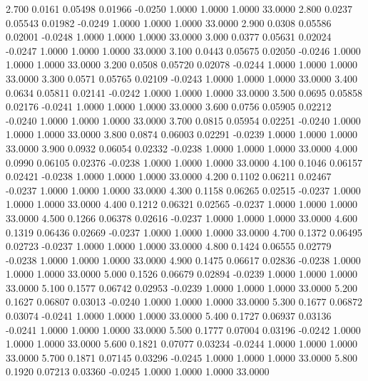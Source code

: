    2.700   0.0161   0.05498   0.01966  -0.0250   1.0000   1.0000   1.0000  33.0000
   2.800   0.0237   0.05543   0.01982  -0.0249   1.0000   1.0000   1.0000  33.0000
   2.900   0.0308   0.05586   0.02001  -0.0248   1.0000   1.0000   1.0000  33.0000
   3.000   0.0377   0.05631   0.02024  -0.0247   1.0000   1.0000   1.0000  33.0000
   3.100   0.0443   0.05675   0.02050  -0.0246   1.0000   1.0000   1.0000  33.0000
   3.200   0.0508   0.05720   0.02078  -0.0244   1.0000   1.0000   1.0000  33.0000
   3.300   0.0571   0.05765   0.02109  -0.0243   1.0000   1.0000   1.0000  33.0000
   3.400   0.0634   0.05811   0.02141  -0.0242   1.0000   1.0000   1.0000  33.0000
   3.500   0.0695   0.05858   0.02176  -0.0241   1.0000   1.0000   1.0000  33.0000
   3.600   0.0756   0.05905   0.02212  -0.0240   1.0000   1.0000   1.0000  33.0000
   3.700   0.0815   0.05954   0.02251  -0.0240   1.0000   1.0000   1.0000  33.0000
   3.800   0.0874   0.06003   0.02291  -0.0239   1.0000   1.0000   1.0000  33.0000
   3.900   0.0932   0.06054   0.02332  -0.0238   1.0000   1.0000   1.0000  33.0000
   4.000   0.0990   0.06105   0.02376  -0.0238   1.0000   1.0000   1.0000  33.0000
   4.100   0.1046   0.06157   0.02421  -0.0238   1.0000   1.0000   1.0000  33.0000
   4.200   0.1102   0.06211   0.02467  -0.0237   1.0000   1.0000   1.0000  33.0000
   4.300   0.1158   0.06265   0.02515  -0.0237   1.0000   1.0000   1.0000  33.0000
   4.400   0.1212   0.06321   0.02565  -0.0237   1.0000   1.0000   1.0000  33.0000
   4.500   0.1266   0.06378   0.02616  -0.0237   1.0000   1.0000   1.0000  33.0000
   4.600   0.1319   0.06436   0.02669  -0.0237   1.0000   1.0000   1.0000  33.0000
   4.700   0.1372   0.06495   0.02723  -0.0237   1.0000   1.0000   1.0000  33.0000
   4.800   0.1424   0.06555   0.02779  -0.0238   1.0000   1.0000   1.0000  33.0000
   4.900   0.1475   0.06617   0.02836  -0.0238   1.0000   1.0000   1.0000  33.0000
   5.000   0.1526   0.06679   0.02894  -0.0239   1.0000   1.0000   1.0000  33.0000
   5.100   0.1577   0.06742   0.02953  -0.0239   1.0000   1.0000   1.0000  33.0000
   5.200   0.1627   0.06807   0.03013  -0.0240   1.0000   1.0000   1.0000  33.0000
   5.300   0.1677   0.06872   0.03074  -0.0241   1.0000   1.0000   1.0000  33.0000
   5.400   0.1727   0.06937   0.03136  -0.0241   1.0000   1.0000   1.0000  33.0000
   5.500   0.1777   0.07004   0.03196  -0.0242   1.0000   1.0000   1.0000  33.0000
   5.600   0.1821   0.07077   0.03234  -0.0244   1.0000   1.0000   1.0000  33.0000
   5.700   0.1871   0.07145   0.03296  -0.0245   1.0000   1.0000   1.0000  33.0000
   5.800   0.1920   0.07213   0.03360  -0.0245   1.0000   1.0000   1.0000  33.0000
